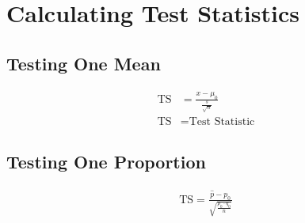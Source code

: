 \documentclass{article}
\begin{document}
\section{Calculating Test Statistics}

\subsection{Testing One Mean}

\begin{align*}
    \text{TS} &= \frac{x-\mu_{0}}{\frac{s}{\sqrt{n}}} \\ 
    \text{TS} &= \text{Test Statistic}
\end{align*}

\subsection{Testing One Proportion}
\begin{align*}
    \text{TS} = \frac{\hat{p} - p_{0}}{\sqrt{\frac{p_{0}\cdot q_{0}}{{n}}}}
\end{align*}
\end{document}
